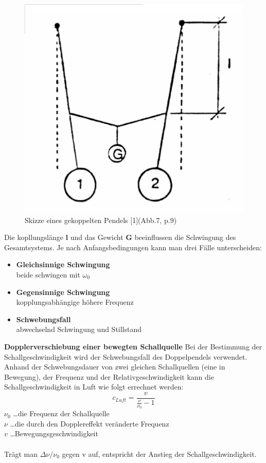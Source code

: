 \documentclass[12pt,a4paper]{article}
\begin{document}
\begin{multicols}{2}
\begin{figure}[H]
	\centering
	\includegraphics[scale=0.4]{./figure/skizze_kopplung.png}
	\caption{Skizze eines gekoppelten Pendels [1](Abb.7, p.9)}
	\label{fig:gekoppelt_skizze}
\end{figure}
Die kopllungslänge \textbf{l} und das Gewicht \textbf{G} beeinflussen die Schwingung des Gesamtsystems. Je nach Anfangsbedingungen kann man drei Fälle unterscheiden:\\
\begin{itemize}
	\item  \textbf{Gleichsinnige Schwingung} \\ beide schwingen mit $\omega_0$
	\item  \textbf{Gegensinnige Schwingung} \\ kopplungsabhängige höhere Frequenz
	\item  \textbf{Schwebungsfall} \\ abwechselnd Schwingung und Stillstand
\end{itemize}


\textbf{Dopplerverschiebung einer bewegten Schallquelle}
Bei der Bestimmung der Schallgeschwindigkeit wird der Schwebungsfall des Doppelpendels verwendet. Anhand der Schwebungsdauer von zwei gleichen Schallquellen (eine in Bewegung), der Frequenz und der Relativgeschwindigkeit kann die Schallgeschwindigkeit in Luft wie folgt errechnet werden:
$$c_{Luft} = \frac{v}{\frac{\nu}{\nu_0}-1}$$
$\nu_0$ \ldots die Frequenz der Schallquelle\\ 
$\nu$ \ldots die durch den Dopplereffekt veränderte Frequenz\\
$v$ \ldots Bewegungsgeschwindigkeit\\
\\
Trägt man $\Delta \nu / \nu_0$ gegen v auf, entspricht der Anstieg der Schallgeschwindigkeit.



\end{multicols}
\end{document}
